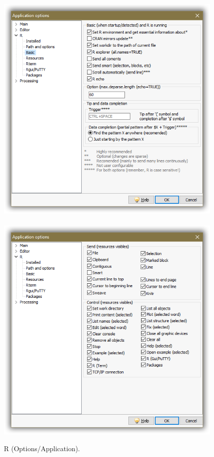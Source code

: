 \begin{figure}[h!]
  \includegraphics[scale=0.35]{./res/app_r_basic.png}~~
  \includegraphics[scale=0.35]{./res/app_r_resources.png}\\
  \caption{R (Options/Application).}
  \label{fig:app_r_a}
\end{figure}

